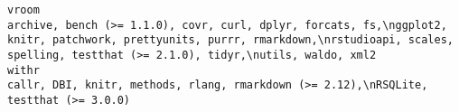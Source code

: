 \documentclass[
  letterpaper,
  DIV=11,
  numbers=noendperiod]{scrreprt}
\begin{document}
\begin{verbatim}
vroom                                                                                                                                                                                                                                                                                                                                                                                                                                                                                                                                                                                                                                                                                                                                                                                                                                                                                                                                                                                                                                                                                                    archive, bench (>= 1.1.0), covr, curl, dplyr, forcats, fs,\nggplot2, knitr, patchwork, prettyunits, purrr, rmarkdown,\nrstudioapi, scales, spelling, testthat (>= 2.1.0), tidyr,\nutils, waldo, xml2
withr                                                                                                                                                                                                                                                                                                                                                                                                                                                                                                                                                                                                                                                                                                                                                                                                                                                                                                                                                                                                                                                                                                                                                                                                                   callr, DBI, knitr, methods, rlang, rmarkdown (>= 2.12),\nRSQLite, testthat (>= 3.0.0)

\end{verbatim}
\end{document}

